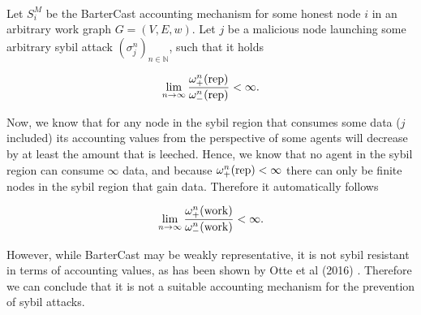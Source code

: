 \begin{example}\ \\
\label{ex:Representativeness of BarterCast}
\noindent{}Let $S^M_i$ be the BarterCast accounting mechanism \cite{Bartercast: A Practical Approach to Prevent Lazy Freeriding in P2P Networks} for some honest node $i$ in an arbitrary work graph $G=(V,E,w)$. Let $j$ be a malicious node launching some arbitrary sybil attack $(\sigma^n_j)_{n\in\mathbb{N}}$, such that it holds

\[
\lim\limits_{n\rightarrow\infty}\frac{\omega^n_{+}({\rm rep})}{\omega^n_{-}({\rm rep})} < \infty.
\]

\noindent{}Now, we know that for any node in the sybil region that consumes some data ($j$ included) its accounting values from the perspective of some agents will decrease by at least the amount that is leeched. Hence, we know that no agent in the sybil region can consume $\infty$ data, and because $\omega^n_{+}({\rm rep})<\infty$ there can only be finite nodes in the sybil region that gain data. Therefore it automatically follows

\[
\lim\limits_{n\rightarrow\infty}\frac{\omega^n_{+}({\rm work})}{\omega^n_{-}({\rm work})} < \infty.
\]

\noindent{}However, while BarterCast may be weakly representative, it is not sybil resistant in terms of accounting values, as has been shown by Otte et al (2016) \cite{Sybil-resistant Trust Mechanisms in Distributed Systems}. Therefore we can conclude that it is not a suitable accounting mechanism for the prevention of sybil attacks. 
\end{example}


